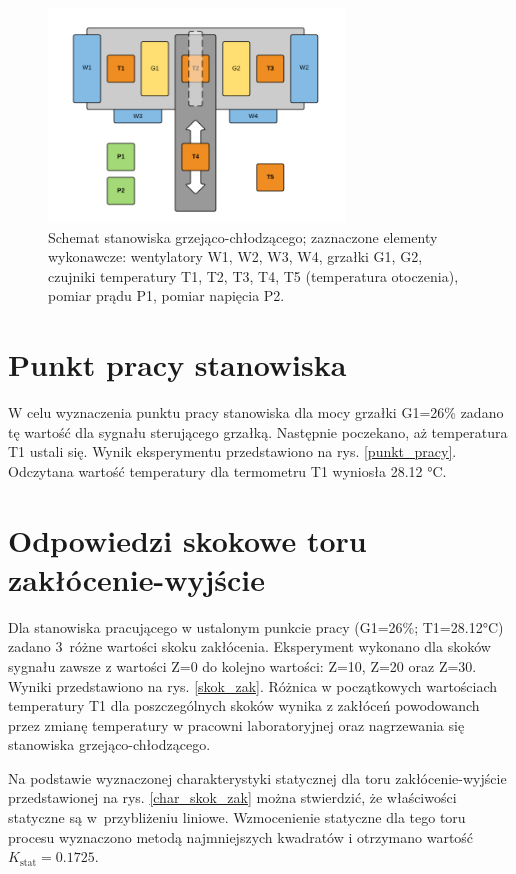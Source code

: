 \documentclass[a4paper,titlepage,11pt,twosides,floatssmall]{mwrep}
\begin{document}
\begin{figure}[H]
		\centering
		\includegraphics[width=0.7\textwidth]{ ./Rysunki/Stanowisko-grzewcze-schemat.png }
		\caption {Schemat stanowiska grzejąco-chłodzącego; zaznaczone elementy wykonawcze: wentylatory W1, W2, W3, W4, grzałki G1, G2, czujniki temperatury T1, T2, T3, T4, T5 (temperatura
otoczenia), pomiar prądu P1, pomiar napięcia P2.}
		\label{stanowisko_grzewcze_schemat}
\end{figure}

\section{Punkt pracy stanowiska}
W celu wyznaczenia punktu pracy stanowiska dla mocy grzałki G1=26\% zadano tę wartość dla sygnału sterującego grzałką. Następnie poczekano, aż temperatura T1 ustali się. Wynik eksperymentu przedstawiono na rys. \ref{punkt_pracy}. Odczytana wartość temperatury dla termometru T1 wyniosła \num{28.12} °C.



\section{Odpowiedzi skokowe toru zakłócenie-wyjście}
Dla stanowiska pracującego w ustalonym punkcie pracy (G1=26\%; T1=\num{28.12}°C) zadano 3~różne wartości skoku zakłócenia. Eksperyment wykonano dla skoków sygnału zawsze z wartości Z=0 do kolejno wartości: Z=10, Z=20 oraz Z=30. Wyniki przedstawiono na rys. \ref{skok_zak}. Różnica w początkowych wartościach temperatury T1 dla poszczególnych skoków wynika z zakłóceń powodowanch przez zmianę temperatury w pracowni laboratoryjnej oraz nagrzewania się stanowiska grzejąco-chłodzącego.


Na podstawie wyznaczonej charakterystyki statycznej dla toru zakłócenie-wyjście przedstawionej na rys. \ref{char_skok_zak} można stwierdzić, że właściwości statyczne są w~przybliżeniu liniowe. Wzmocenienie statyczne dla tego toru procesu wyznaczono metodą najmniejszych kwadratów i otrzymano wartość $K_{\mathrm{stat}}=0.1725$.
\end{document}

